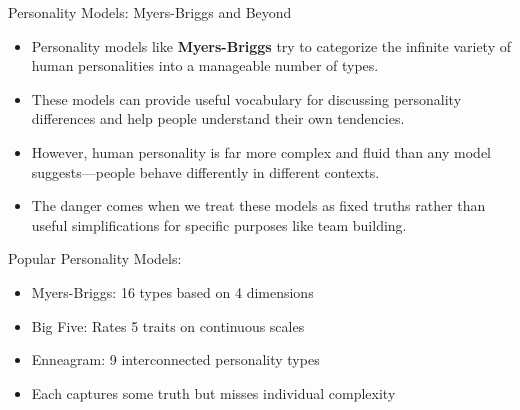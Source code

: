 \documentclass{beamer}
\begin{document}
	\begin{frame}{Personality Models: Myers-Briggs and Beyond}
		\begin{itemize}
			\item Personality models like \textbf{Myers-Briggs} try to categorize the infinite variety of human personalities into a manageable number of types.
			\item These models can provide useful vocabulary for discussing personality differences and help people understand their own tendencies.
			\item However, human personality is far more complex and fluid than any model suggests—people behave differently in different contexts.
			\item The danger comes when we treat these models as fixed truths rather than useful simplifications for specific purposes like team building.
		\end{itemize}
		
		\begin{example}
			Popular Personality Models:
			\begin{itemize}
				\item Myers-Briggs: 16 types based on 4 dimensions
				\item Big Five: Rates 5 traits on continuous scales
				\item Enneagram: 9 interconnected personality types
				\item Each captures some truth but misses individual complexity
			\end{itemize}
		\end{example}
	\end{frame}
	
\end{document}
